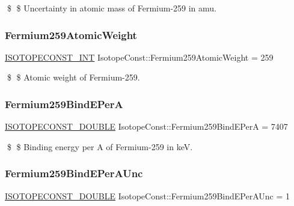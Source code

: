 \$ \$ Uncertainty in atomic mass of Fermium-\/259 in amu. \mbox{\label{group___isotope_const-_fermium-_fm259_gae5e6aeceb081aa35f4afdcf780416f9f}} 
\subsubsection{\texorpdfstring{Fermium259\+Atomic\+Weight}{Fermium259AtomicWeight}}
{\footnotesize\ttfamily \mbox{\hyperlink{group___isotope_const-_macros_ga5f18360b3e99483a35c32d789e62621c}{I\+S\+O\+T\+O\+P\+E\+C\+O\+N\+S\+T\+\_\+\+I\+NT}} Isotope\+Const\+::\+Fermium259\+Atomic\+Weight = 259}

\$ \$ Atomic weight of Fermium-\/259. \mbox{\label{group___isotope_const-_fermium-_fm259_gade5b2d6d4b601638f388d4417f2befa8}} 
\subsubsection{\texorpdfstring{Fermium259\+Bind\+E\+PerA}{Fermium259BindEPerA}}
{\footnotesize\ttfamily \mbox{\hyperlink{group___isotope_const-_macros_ga8f45a7272ce02c0b4c65c44636ed719a}{I\+S\+O\+T\+O\+P\+E\+C\+O\+N\+S\+T\+\_\+\+D\+O\+U\+B\+LE}} Isotope\+Const\+::\+Fermium259\+Bind\+E\+PerA = 7407}

\$ \$ Binding energy per A of Fermium-\/259 in keV. \mbox{\label{group___isotope_const-_fermium-_fm259_ga0818f3add9861b9caebd8e3bcaf91497}} 
\subsubsection{\texorpdfstring{Fermium259\+Bind\+E\+Per\+A\+Unc}{Fermium259BindEPerAUnc}}
{\footnotesize\ttfamily \mbox{\hyperlink{group___isotope_const-_macros_ga8f45a7272ce02c0b4c65c44636ed719a}{I\+S\+O\+T\+O\+P\+E\+C\+O\+N\+S\+T\+\_\+\+D\+O\+U\+B\+LE}} Isotope\+Const\+::\+Fermium259\+Bind\+E\+Per\+A\+Unc = 1}

